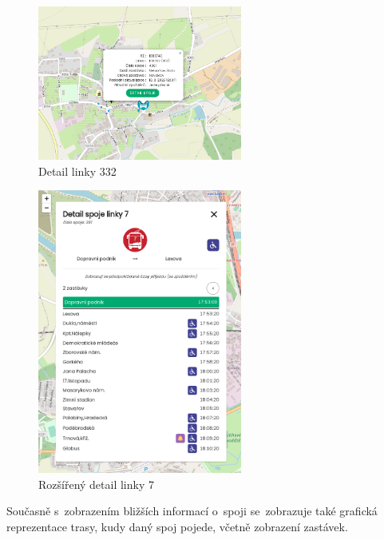 \begin{figure}[H]
    \centering
    \includegraphics[width=0.6\textwidth]{images/small_detail.png}
    \caption{Detail linky 332}
    \label{detail332}
\end{figure}

\begin{figure}[H]
    \centering
    \includegraphics[width=0.6\textwidth]{images/global_pce_con_detail_7.png}
    \caption{Rozšířený detail linky 7}
    \label{detail7}
\end{figure}

Současně s~zobrazením bližších informací o~spoji se~zobrazuje také grafická reprezentace trasy, kudy daný spoj pojede, včetně zobrazení zastávek.

